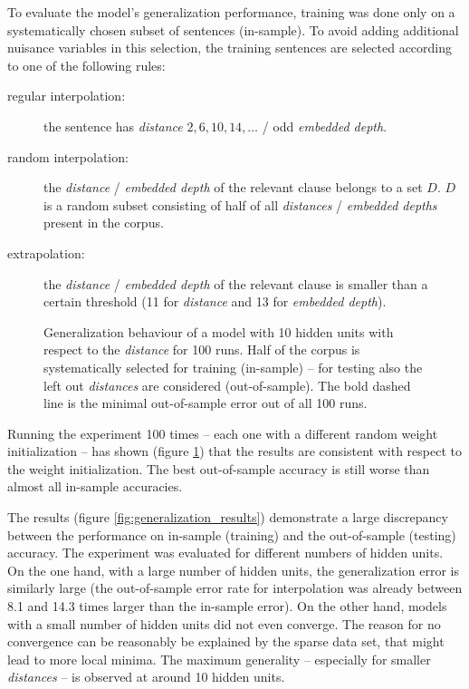 \documentclass[11pt,a4paper]{article}
\begin{document}
To evaluate the model's generalization performance, training was done only on a systematically chosen subset of sentences (in-sample). To avoid adding additional nuisance variables in this selection, the training sentences are selected according to one of the following rules:

\begin{samepage}
\begin{description}
    \item[regular interpolation:] the sentence has \emph{distance} $2,6,10,14,\ldots$ / odd \emph{embedded depth}.
    \item[random interpolation:] the \emph{distance} / \emph{embedded depth} of the relevant clause belongs to a set $D$. $D$ is a random subset consisting of half of all \emph{distances} / \emph{embedded depths} present in the corpus.
    \item[extrapolation:] the \emph{distance} / \emph{embedded depth} of the relevant clause is smaller than a certain threshold (11 for \emph{distance} and 13 for \emph{embedded depth}).
\end{description}
\end{samepage}

\begin{figure}
    \centering
    
    \caption{Generalization behaviour of a model with 10 hidden units with respect to the \emph{distance} for 100 runs. Half of the corpus is systematically selected for training (in-sample) -- for testing also the left out \emph{distances} are considered (out-of-sample). The bold dashed line is the minimal out-of-sample error out of all 100 runs.}
    \label{fig:distance_random_multiple}
\end{figure}

Running the experiment 100 times -- each one with a different random weight initialization -- has shown (figure \ref{fig:distance_random_multiple}) that the results are consistent with respect to the weight initialization. The best out-of-sample accuracy is still worse than almost all in-sample accuracies.

The results (figure \ref{fig:generalization_results}) demonstrate a large discrepancy between the performance on in-sample (training) and the out-of-sample (testing) accuracy. The experiment was evaluated for different numbers of hidden units. On the one hand, with a large number of hidden units, the generalization error is similarly large (the out-of-sample error rate for interpolation was already between 8.1 and 14.3 times larger than the in-sample error). On the other hand, models with a small number of hidden units did not even converge. The reason for no convergence can be reasonably be explained by the sparse data set, that might lead to more local minima. The maximum generality -- especially for smaller \emph{distances} -- is observed at around 10 hidden units.
\end{document}
